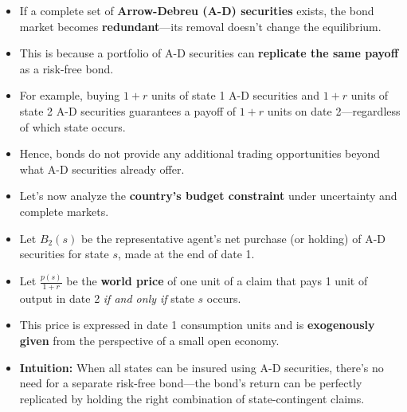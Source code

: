 \documentclass[12pt]{article}
\begin{document}
\begin{itemize}
\item If a complete set of \textbf{Arrow-Debreu (A-D) securities} exists, the bond market becomes \textbf{redundant}—its removal doesn’t change the equilibrium.

\item This is because a portfolio of A-D securities can \textbf{replicate the same payoff} as a risk-free bond.

\item For example, buying $1 + r$ units of state 1 A-D securities and $1 + r$ units of state 2 A-D securities guarantees a payoff of $1 + r$ units on date 2—regardless of which state occurs.

\item Hence, bonds do not provide any additional trading opportunities beyond what A-D securities already offer.

\item Let’s now analyze the \textbf{country’s budget constraint} under uncertainty and complete markets.

\item Let $B_2(s)$ be the representative agent’s net purchase (or holding) of A-D securities for state $s$, made at the end of date 1.

\item Let $\frac{p(s)}{1 + r}$ be the \textbf{world price} of one unit of a claim that pays 1 unit of output in date 2 \textit{if and only if} state $s$ occurs.

\item This price is expressed in date 1 consumption units and is \textbf{exogenously given} from the perspective of a small open economy.

\item \textbf{Intuition:} When all states can be insured using A-D securities, there's no need for a separate risk-free bond—the bond's return can be perfectly replicated by holding the right combination of state-contingent claims.
\end{itemize}
\end{document}
